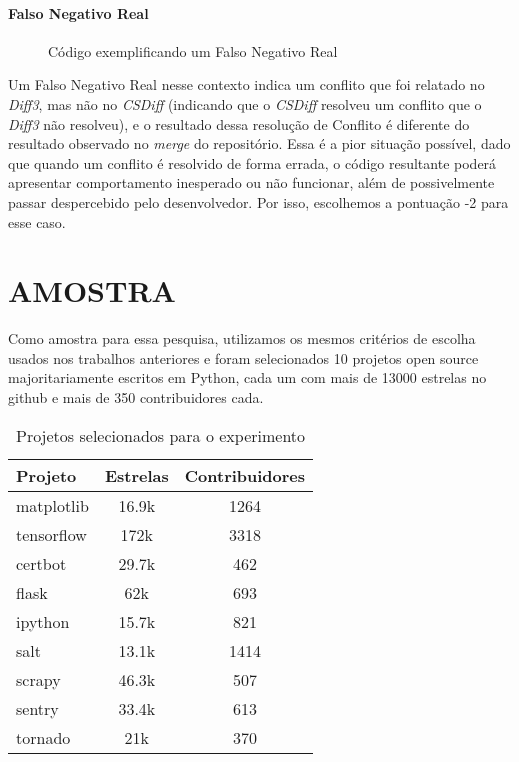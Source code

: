 \paragraph{Falso Negativo Real}
\begin{figure}[ht]
	\begin{center}
		
		\caption{Código exemplificando um Falso Negativo Real}\label{falso_negativo_real}
	\end{center}
\end{figure}

Um Falso Negativo Real nesse contexto indica um conflito que foi relatado no
\emph{Diff3}, mas não no \emph{CSDiff} (indicando que o \emph{CSDiff} resolveu
um conflito que o \emph{Diff3} não resolveu), e o resultado dessa resolução de
Conflito é diferente do resultado observado no \emph{merge} do repositório.
Essa é a pior situação possível, dado que quando um conflito é resolvido de
forma errada, o código resultante poderá apresentar comportamento inesperado ou
não funcionar, além de possivelmente passar despercebido pelo desenvolvedor.
Por isso, escolhemos a pontuação -2 para esse caso.

\section{AMOSTRA}

Como amostra para essa pesquisa, utilizamos os mesmos critérios de escolha
usados nos trabalhos anteriores e foram selecionados 10 projetos open source
majoritariamente escritos em Python, cada um com mais de 13000 estrelas no
github e mais de 350 contribuidores cada.

\begin{table}[ht]
	\begin{center}
		\begin{tabular}{|l|c|c|}
			\hline
			\textbf{Projeto} & \textbf{Estrelas} & \textbf{Contribuidores} \\
			\hline
			matplotlib       & 16.9k             & 1264                    \\
			tensorflow       & 172k              & 3318                    \\
			certbot          & 29.7k             & 462                     \\
			flask            & 62k               & 693                     \\
			ipython          & 15.7k             & 821                     \\
			salt             & 13.1k             & 1414                    \\
			scrapy           & 46.3k             & 507                     \\
			sentry           & 33.4k             & 613                     \\
			tornado          & 21k               & 370                     \\
			\hline
		\end{tabular}
	\end{center}
	\caption{Projetos selecionados para o experimento}\label{tabela_projeto}
\end{table}

